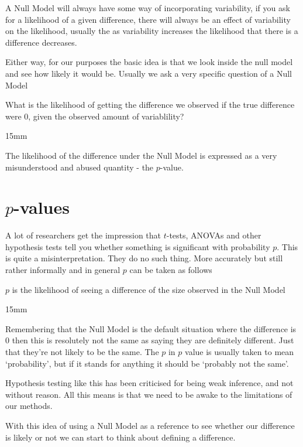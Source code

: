 \documentclass[
]{book}
\newenvironment{myquote}
{\begin{large}
\begin{itshape}
\begin{minipage}{6cm}
}
{
\begin{vspace}{15mm}
\end{vspace}
\end{minipage}
\end{itshape}
\end{large} 
}
\begin{document}
A Null Model will always have some way of incorporating variability, if you ask for a likelihood of a given difference, there will always be an effect of variability on the likelihood, usually the as variability increases the likelihood that there is a difference decreases.

Either way, for our purposes the basic idea is that we look inside the null model and see how likely it would be. Usually we ask a very specific question of a Null Model

\begin{myquote}
What is the likelihood of getting the difference we observed if the true difference were 0, given the observed amount of variablility?
\end{myquote}

The likelihood of the difference under the Null Model is expressed as a very misunderstood and abused quantity - the \(p\)-value.

\hypertarget{p-values}{%
\section{\texorpdfstring{\(p\)-values}{p-values}}\label{p-values}}

A lot of researchers get the impression that \(t\)-tests, ANOVAs and other hypothesis tests tell you whether something is significant with probability \(p\). This is quite a misinterpretation. They do no such thing. More accurately but still rather informally and in general \(p\) can be taken as follows

\begin{myquote}
\(p\) is the likelihood of seeing a difference of the size observed in the Null Model
\end{myquote}

Remembering that the Null Model is the default situation where the difference is 0 then this is resolutely not the same as saying they are definitely different. Just that they're not likely to be the same. The \(p\) in \(p\) value is usually taken to mean `probability', but if it stands for anything it should be `probably not the same'.

Hypothesis testing like this has been criticised for being weak inference, and not without reason. All this means is that we need to be awake to the limitations of our methods.

With this idea of using a Null Model as a reference to see whether our difference is likely or not we can start to think about defining a difference.
\end{document}
